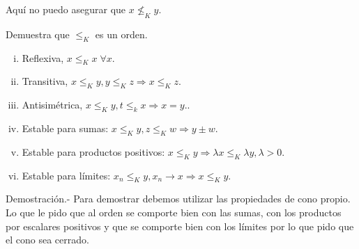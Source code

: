 \begin{paracol}{2}
\begin{center}
\end{center}

Aquí no puedo asegurar que $x\not\leq_K y.$

{\color{blue}
\begin{ejer}
    Demuestra que $\leq_K$ es un orden.
    \begin{enumerate}[i)]
	\item Reflexiva, $x\leq_K x \; \forall x.$
	\item Transitiva, $x\leq_K y, y\leq_K z \Rightarrow x \leq_K z$.
	\item Antisimétrica, $x\leq_Ky, t\leq_k x \Rightarrow x=y$..
	\item Estable para sumas: $x\leq_K y, z\leq_K w \Rightarrow y\pm w$.
	\item Estable para productos positivos: $x\leq_K y \Rightarrow \lambda x\leq_K \lambda y, \lambda >0$.
	\item Estable para límites: $x_n\leq_K y, x_n\to x \Rightarrow x\leq_K y$.
    \end{enumerate}
	    Demostración.-\; Para demostrar debemos utilizar las propiedades de cono propio. Lo que le pido que al orden se comporte bien con las sumas, con los productos por escalares positivos y que se comporte bien con los límites por lo que pido que el cono sea cerrado.
\end{ejer}
}


\end{paracol}
